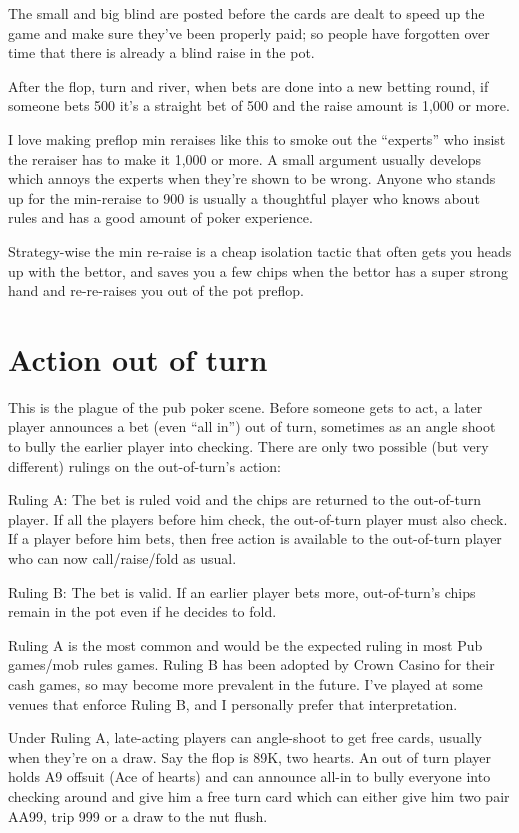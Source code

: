 The small and big blind are posted before the cards are dealt to
speed up the game and make sure they've been properly paid; so
people have forgotten over time that there is already a blind raise
in the pot.

After the flop, turn and river, when bets are done into a new
betting round, if someone bets 500 it's a straight bet of 500
and the raise amount is 1,000 or more.

I love making preflop min reraises like this to smoke out
the ``experts'' who insist the reraiser has to make it 1,000
or more. A small argument usually develops which annoys the
experts when they're shown to be wrong. Anyone who stands
up for the min-reraise to 900 is usually a thoughtful player
who knows about rules and has a good amount of poker experience.

Strategy-wise the min re-raise is a cheap isolation tactic
that often gets you heads up with the bettor, and saves you
a few chips when the bettor has a super strong hand and
re-re-raises you out of the pot preflop.

\section{Action out of turn}

This is the plague of the pub poker scene. Before
someone gets to act, a later player announces a bet (even ``all in'')
out of turn, sometimes as an angle shoot to bully the earlier player
into checking. There are only two possible (but very different)
rulings on the out-of-turn's action:

Ruling A: The bet is ruled void and the chips are returned to the out-of-turn
player. If all the players before him check, the out-of-turn player
must also check. If a player before him bets, then free
action is available to the out-of-turn player who can now call/raise/fold
as usual.

Ruling B: The bet is valid. If an earlier player bets more, out-of-turn's chips
remain in the pot even if he decides to fold. 

Ruling A is the most common and would be the expected ruling in most
Pub games/mob rules games. Ruling B has been adopted
by Crown Casino for their cash games, so may become more prevalent
in the future. I've played at some venues that enforce Ruling B, and
I personally prefer that interpretation.

Under Ruling A, late-acting players can angle-shoot to get free
cards, usually when they're on a draw. Say the flop is 89K, two hearts.
An out of turn player holds A9 offsuit (Ace of hearts) and can announce
all-in to bully everyone into checking around and give him a free
turn card which can either give him two pair AA99, trip 999 or a draw
to the nut flush.

